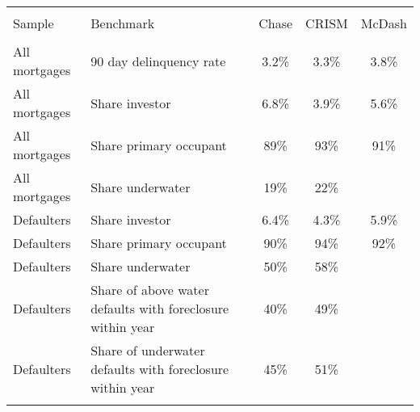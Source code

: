 
\begin{tabular}{@{\extracolsep{5pt}} llccc} 
\\[-1.8ex]\hline 
\hline \\[-1.8ex] 
Sample & Benchmark & Chase & CRISM & McDash \\ 
\hline \\[-1.8ex] 
All mortgages & 90 day delinquency rate & 3.2\% & 3.3\% & 3.8\% \\ 
All mortgages & Share investor & 6.8\% & 3.9\% & 5.6\% \\ 
All mortgages & Share primary occupant & 89\% & 93\% & 91\% \\ 
All mortgages & Share underwater & 19\% & 22\% &  \\ 
Defaulters & Share investor & 6.4\% & 4.3\% & 5.9\% \\ 
Defaulters & Share primary occupant & 90\% & 94\% & 92\% \\ 
Defaulters & Share underwater & 50\% & 58\% &  \\ 
Defaulters & Share of above water defaults with foreclosure within year & 40\% & 49\% &  \\ 
Defaulters & Share of underwater defaults with foreclosure within year & 45\% & 51\% &  \\ 
\hline \\[-1.8ex] 
\end{tabular} 
